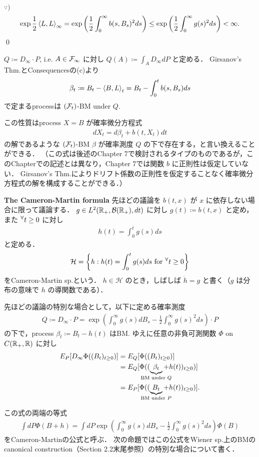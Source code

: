 \documentclass{jsarticle}
\begin{document}
$\because)$
\begin{align}
    \exp\frac{1}{2}\left\langle L,L\right\rangle_\infty
    = \exp\left(\frac{1}{2}\int_0^\infty b(s,B_s)^2 ds\right)
    \le \exp\left(\frac{1}{2}\int_0^\infty g(s)^2 ds\right)
    < \infty.
\end{align}\qed

$Q\coloneqq D_\infty\cdot P$, i.e. $A\in\mathcal{F}_\infty$ に対し $Q(A)\coloneqq\int_A D_\infty dP$ と定める．
Girsanov's Thm.とConsequencesの(c)より
\begin{align}
    \beta_t
    \coloneqq B_t-\left\langle B,L\right\rangle_t
    = B_t-\int_0^t b(s,B_s)ds
\end{align}
で定まるprocessは $(\mathcal{F}_t)$-BM under $Q.$

この性質はprocess $X=B$ が確率微分方程式
\begin{align}
    dX_t=d\beta_t+b(t,X_t)dt
\end{align}
の解であるような $(\mathcal{F}_t)$-BM $\beta$ が確率測度 $Q$ の下で存在する，と言い換えることができる．
（この式は後述のChapter 7で検討されるタイプのものであるが，このChapterでの記述とは異なり，Chapter 7では関数 $b$ に正則性は仮定していない．
Girsanov's Thm.によりドリフト係数の正則性を仮定することなく確率微分方程式の解を構成することができる．）

\textbf{The Cameron-Martin formula}
先ほどの議論を $b(t,x)$ が $x$ に依存しない場合に限って議論する．
$g\in L^2(\mathbb{R}_+,\mathcal{B}(\mathbb{R}_+),dt)$ に対し $g(t)\coloneqq b(t,x)$ と定め，また ${}^{\forall} t\ge0$ に対し
\begin{align}
    h(t)=\int_{0}^{t}g(s)ds
\end{align}
と定める．
\begin{align}
    \mathcal{H}
    = \left\{h:h(t)=\int_{0}^{t}g(s)ds\text{ for }{}^{\forall} t\ge0\right\}
\end{align}
をCameron-Martin sp.という．
$h\in\mathcal{H}$ のとき，しばしば $\dot{h}=g$ と書く（$g$ は分布の意味で $h$ の導関数である）．

先ほどの議論の特別な場合として，以下に定める確率測度
\begin{align}
    Q
    \coloneqq D_\infty\cdot P
    = \exp\left(\int_0^\infty g(s)dB_s-\frac{1}{2}\int_0^\infty g(s)^2 ds\right)\cdot P
\end{align}
の下で，process $\beta_t\coloneqq B_t-h(t)$ はBM.
ゆえに任意の非負可測関数 $\Phi$ on $C(\mathbb{R}_+,\mathbb{R})$ に対し
\begin{align}
    E_P[D_\infty\Phi((B_t)_{t\ge0})]
    &= E_Q[\Phi((B_t)_{t\ge0})] \\
    &= E_Q[\Phi((\UB{\beta_t}{\text{BM under }Q}+h(t))_{t\ge0})] \\
    &= E_P[\Phi((\UB{B_t}{\text{BM under }P}+h(t))_{t\ge0})].
\end{align}

この式の両端の等式
\begin{align}
    \int dP\Phi(B+h)
    = \int dP\exp\left(\int_0^\infty g(s)dB_s-\frac{1}{2}\int_0^\infty g(s)^2 ds\right)\Phi(B)
\end{align}
をCameron-Martinの公式と呼ぶ．
次の命題ではこの公式をWiener sp.上のBMのcanonical construction（Section 2.2末尾参照）の特別な場合について書く．
\end{document}

